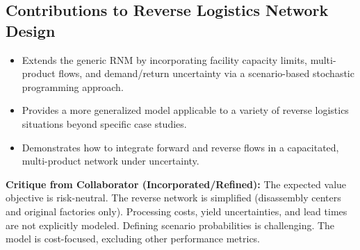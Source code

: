 \subsection*{Contributions to Reverse Logistics Network Design}
\begin{itemize}
    \item Extends the generic RNM by incorporating facility capacity limits, multi-product flows, and demand/return uncertainty via a scenario-based stochastic programming approach.
    \item Provides a more generalized model applicable to a variety of reverse logistics situations beyond specific case studies.
    \item Demonstrates how to integrate forward and reverse flows in a capacitated, multi-product network under uncertainty.
\end{itemize}
\textbf{Critique from Collaborator (Incorporated/Refined):} The expected value objective is risk-neutral. The reverse network is simplified (disassembly centers and original factories only). Processing costs, yield uncertainties, and lead times are not explicitly modeled. Defining scenario probabilities is challenging. The model is cost-focused, excluding other performance metrics.